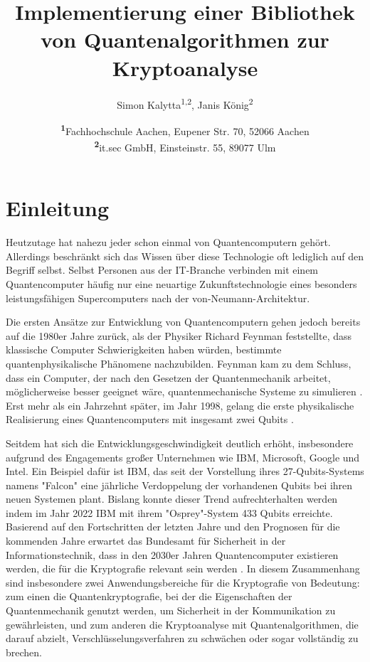 \documentclass[
	a4paper, %
	10pt, %
	unnumberedsections, %
	twoside, %
]{LTJournalArticle}
\title{Implementierung einer Bibliothek von Quantenalgorithmen zur Kryptoanalyse} %
\author{%
	Simon Kalytta\textsuperscript{1,2}, Janis König\textsuperscript{2}
}
\date{\footnotesize\textsuperscript{\textbf{1}}Fachhochschule Aachen, Eupener Str. 70, 52066 Aachen\\ \textsuperscript{\textbf{2}}it.sec GmbH, Einsteinstr. 55, 89077 Ulm}
\begin{document}
\maketitle %


\section{Einleitung}

Heutzutage hat nahezu jeder schon einmal von Quantencomputern gehört. Allerdings beschränkt sich das Wissen über diese Technologie oft lediglich auf den Begriff selbst. Selbst Personen aus der IT-Branche verbinden mit einem Quantencomputer häufig nur eine neuartige Zukunftstechnologie eines besonders leistungsfähigen Supercomputers nach der von-Neumann-Architektur.

Die ersten Ansätze zur Entwicklung von Quantencomputern gehen jedoch bereits auf die 1980er Jahre zurück, als der Physiker Richard Feynman feststellte, dass klassische Computer Schwierigkeiten haben würden, bestimmte quantenphysikalische Phänomene nachzubilden. Feynman kam zu dem Schluss, dass ein Computer, der nach den Gesetzen der Quantenmechanik arbeitet, möglicherweise besser geeignet wäre, quantenmechanische Systeme zu simulieren \autocite{Feynman:1982}. Erst mehr als ein Jahrzehnt später, im Jahr 1998, gelang die erste physikalische Realisierung eines Quantencomputers mit insgesamt zwei Qubits \autocite{Chuang:1998ExperimentalIO}.

Seitdem hat sich die Entwicklungsgeschwindigkeit deutlich erhöht, insbesondere aufgrund des Engagements großer Unternehmen wie IBM, Microsoft, Google und Intel. Ein Beispiel dafür ist IBM, das seit der Vorstellung ihres 27-Qubits-Systems namens "Falcon" eine jährliche Verdoppelung der vorhandenen Qubits bei ihren neuen Systemen plant. Bislang konnte dieser Trend aufrechterhalten werden indem im Jahr 2022 IBM mit ihrem "Osprey"-System 433 Qubits erreichte\autocite{IBM:2022}.
Basierend auf den Fortschritten der letzten Jahre und den Prognosen für die kommenden Jahre erwartet das Bundesamt für Sicherheit in der Informationstechnik, dass in den 2030er Jahren Quantencomputer existieren werden, die für die Kryptografie relevant sein werden \autocite{BSI:2023}. In diesem Zusammenhang sind insbesondere zwei Anwendungsbereiche für die Kryptografie von Bedeutung: zum einen die Quantenkryptografie, bei der die Eigenschaften der Quantenmechanik genutzt werden, um Sicherheit in der Kommunikation zu gewährleisten, und zum anderen die Kryptoanalyse mit Quantenalgorithmen, die darauf abzielt, Verschlüsselungsverfahren zu schwächen oder sogar vollständig zu brechen.
\end{document}

